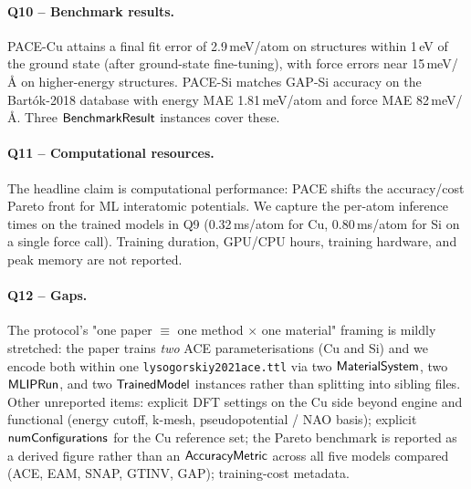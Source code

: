 \paragraph{Q10 -- Benchmark results.}
PACE-Cu attains a final fit error of 2.9\,meV/atom on structures
within 1\,eV of the ground state (after ground-state fine-tuning),
with force errors near 15\,meV/\AA{} on higher-energy structures.
PACE-Si matches GAP-Si accuracy on the Bart\'ok-2018 database with
energy MAE 1.81\,meV/atom and force MAE 82\,meV/\AA. Three
$\mathsf{BenchmarkResult}$ instances cover these.


\paragraph{Q11 -- Computational resources.}
The headline claim is computational performance: PACE shifts the
accuracy/cost Pareto front for ML interatomic potentials. We capture
the per-atom inference times on the trained models in Q9
(0.32\,ms/atom for Cu, 0.80\,ms/atom for Si on a single force
call). Training duration, GPU/CPU hours, training hardware, and
peak memory are not reported.


\paragraph{Q12 -- Gaps.}
The protocol's "one paper $\equiv$ one method $\times$ one material"
framing is mildly stretched: the paper trains \emph{two} ACE
parameterisations (Cu and Si) and we encode both within one
\texttt{lysogorskiy2021ace.ttl} via two $\mathsf{MaterialSystem}$, two
$\mathsf{MLIPRun}$, and two $\mathsf{TrainedModel}$ instances rather
than splitting into sibling files. Other unreported items: explicit
DFT settings on the Cu side beyond engine and functional (energy
cutoff, k-mesh, pseudopotential / NAO basis); explicit
$\mathsf{numConfigurations}$ for the Cu reference set; the Pareto
benchmark is reported as a derived figure rather than an
$\mathsf{AccuracyMetric}$ across all five models compared (ACE, EAM,
SNAP, GTINV, GAP); training-cost metadata.
